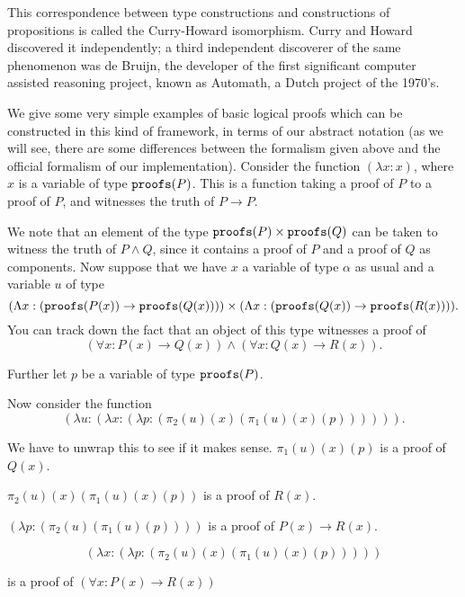 \documentclass[12pt]{slides}
\begin{document}
\begin{slide}

This correspondence between type constructions and constructions of propositions is called the Curry-Howard isomorphism.  Curry and Howard discovered it independently; a third independent discoverer of the same phenomenon was de Bruijn, the developer of the first significant computer assisted reasoning project, known as Automath, a Dutch project of the 1970's.

\end{slide}

\begin{slide}

We give some very simple examples of basic logical proofs which can be constructed in this kind of framework, in terms of our abstract notation
(as we will see, there are some differences between the formalism given above and the official formalism of our implementation).  Consider the function
$(\lambda x:x)$, where $x$ is a variable of type ${\tt proofs}(P)$.  This is a function taking a proof of $P$ to a proof of $P$, and witnesses the truth of
$P \rightarrow P$.

\end{slide}

\begin{slide}

We note that an element of the type ${\tt proofs}(P) \times {\tt proofs}(Q)$ can be taken to witness the truth of $P \wedge Q$, since it contains
a proof of $P$ and a proof of $Q$ as components.  Now suppose that we have $x$ a variable of type $\alpha$ as usual and a variable  $u$ 
of type {\tiny $$(\Lambda x:({\tt proofs}(P(x))\rightarrow {\tt proofs}(Q(x)))) \times (\Lambda x:({\tt proofs}(Q(x)) \rightarrow {\tt proofs}(R(x)))).$$} You can track down the fact
that an object of this type witnesses a proof of $$(\forall x:P(x) \rightarrow Q(x)) \wedge (\forall x:Q(x) \rightarrow R(x)).$$

\end{slide}

\begin{slide}

Further let $p$ be a variable of type ${\tt proofs}(P)$.

Now consider the function $$(\lambda u:(\lambda x:(\lambda p:(\pi_2(u)(x)(\pi_1(u)(x)(p)))))).$$

We have to unwrap this to see if it makes sense.  $\pi_1(u)(x)(p)$ is a proof of $Q(x)$.

$\pi_2(u)(x)(\pi_1(u)(x)(p))$ is a proof of $R(x)$.

$(\lambda p:(\pi_2(u)(\pi_1(u)(p))))$ is a proof of $P(x) \rightarrow R(x)$.

$$(\lambda x:(\lambda p:(\pi_2(u)(x)(\pi_1(u)(x)(p)))))$$

is a proof of $(\forall x:P(x) \rightarrow R(x))$

\end{slide}
\end{document}
